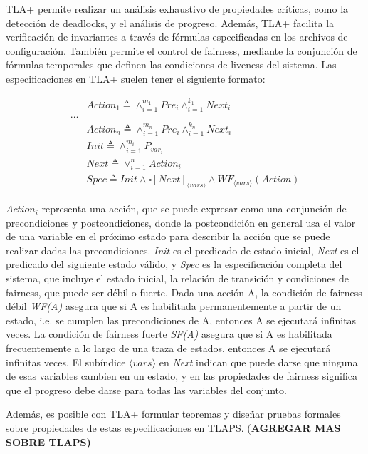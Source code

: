 \documentclass[runningheads]{llncs}
\begin{document}
TLA+ permite realizar un análisis exhaustivo de propiedades críticas, como la detección de deadlocks, y el análisis de progreso. Además, TLA+ facilita la verificación de invariantes a través de fórmulas especificadas en los archivos de configuración. También permite el control de fairness, mediante la conjunción de fórmulas temporales que definen las condiciones de liveness del sistema. Las especificaciones en TLA+ suelen tener el siguiente formato:

\[
\begin{aligned}
    & Action_1 \triangleq \land_{i=1}^{m_1} Pre_i \land_{i=1}^{k_1} Next_i \\
    \dots \\
    & Action_n \triangleq \land_{i=1}^{m_n} Pre_i \land_{i=1}^{k_n} Next_i \\
    & Init \triangleq \land_{i=1}^{m_i} P_{var_i} \\
    & Next \triangleq \lor_{i=1}^{n} Action_i \\
    & Spec \triangleq Init \land \square [Next]_{\langle vars \rangle} \land WF_{\langle vars \rangle}(Action)
\end{aligned}
\]

$Action_{i}$ representa una acción, que se puede expresar como una conjunción de precondiciones y postcondiciones, donde la postcondición en general usa el valor de una variable en el próximo estado para describir la acción que se puede realizar dadas las precondiciones. \textit{Init} es el predicado de estado inicial, \textit{Next} es el predicado del siguiente estado válido, y \textit{Spec} es la especificación completa del sistema, que incluye el estado inicial, la relación de transición y condiciones de fairness, que puede ser débil o fuerte. Dada una acción A, la condición de fairness débil \textit{WF(A)} asegura que si A es habilitada permanentemente a partir de un estado, i.e. se cumplen las precondiciones de A, entonces A se ejecutará infinitas veces. La condición de fairness fuerte \textit{SF(A)} asegura que si A es habilitada frecuentemente a lo largo de una traza de estados, entonces A se ejecutará infinitas veces. El subíndice $\langle vars \rangle$ en \textit{Next} indican que puede darse que ninguna de esas variables cambien en un estado, y en las propiedades de fairness significa que el progreso debe darse para todas las variables del conjunto. 

Además, es posible con TLA+ formular teoremas y diseñar pruebas formales sobre propiedades de estas especificaciones en TLAPS. (\textbf{AGREGAR MAS SOBRE TLAPS)}
\end{document}
